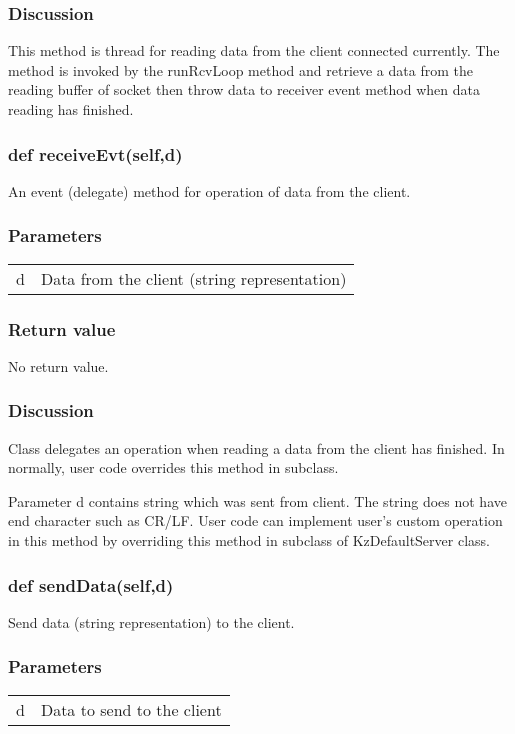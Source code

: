 \documentclass[a4paper,10pt]{jsarticle}
\begin{document}
\subsubsection*{Discussion}
This method is thread for reading data from the client connected currently.
The method is invoked by the runRcvLoop method and retrieve a data from the reading buffer of socket then throw data to receiver event method when data reading has finished.


\subsubsection{def receiveEvt(self,d)}
An event (delegate) method for operation of data from the client.

\subsubsection*{Parameters}
\begin{tabular}{ll}
d	&Data from the client (string representation)
\end{tabular}

\subsubsection*{Return value}
No return value.

\subsubsection*{Discussion}
Class delegates an operation when reading a data from the client has finished. In normally, user code overrides this method in subclass.

Parameter d contains string which was sent from client. The string does not have end character such as CR/LF.
User code can implement user's custom operation in this method by overriding this method in subclass of KzDefaultServer class.

\subsubsection{def sendData(self,d)}
Send data (string representation) to the client.

\subsubsection*{Parameters}
\begin{tabular}{ll}
d	&Data to send to the client
\end{tabular}
\end{document}
